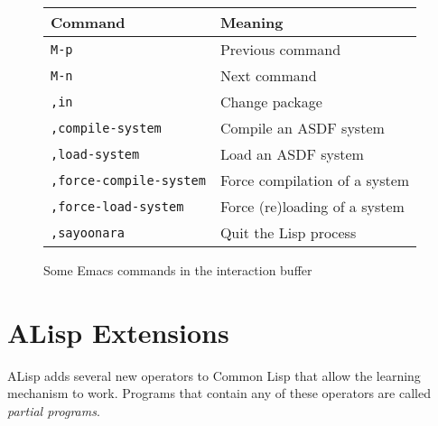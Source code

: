 \documentclass[a4paper]{amsart}
\begin{document}
\begin{figure}[tp]
  \centering
  \begin{tabular}{|l|l|}
    \hline
    Command & Meaning \\
    \hline\hline
    \texttt{M-p} & Previous command\\
    \hline
    \texttt{M-n} & Next command\\
    \hline
    \texttt{,in} & Change package\\
    \hline
    \texttt{,compile-system} & Compile an ASDF system\\
    \hline
    \texttt{,load-system} & Load an ASDF system\\
    \hline
    \texttt{,force-compile-system} & Force compilation of a system\\
    \hline
    \texttt{,force-load-system} & Force (re)loading of a system\\
    \hline
    \texttt{,sayoonara} & Quit the Lisp process\\
    \hline
  \end{tabular}
  \caption{Some Emacs commands in the interaction buffer}
  \label{fig:emacs-interaction}
\end{figure}

\section{ALisp Extensions}
\label{sec:alisp-extensions}

ALisp adds several new operators to Common Lisp that allow the
learning mechanism to work.  Programs that contain any of these
operators are called \emph{partial programs}.
\end{document}
